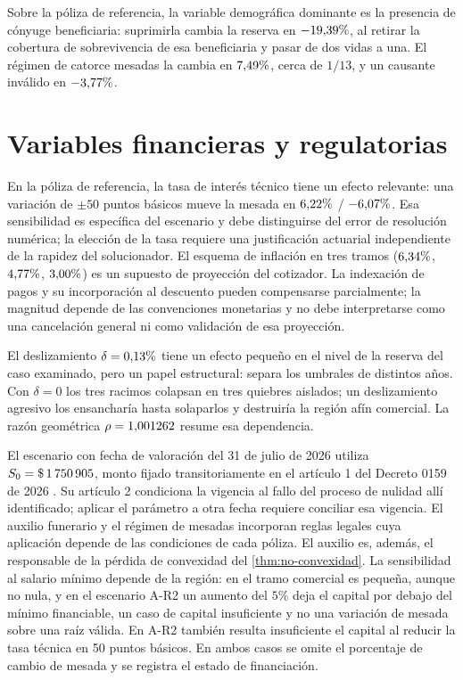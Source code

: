 Sobre la póliza de referencia, la variable demográfica dominante es la presencia de
cónyuge beneficiaria: suprimirla cambia la reserva en $-19{,}39\%$,
al retirar la cobertura de sobrevivencia de esa beneficiaria y pasar de dos vidas
a una. El régimen de catorce mesadas la cambia en $7{,}49\%$, cerca
de $1/13$, y un causante inválido en $-3{,}77\%$.

\section{Variables financieras y regulatorias}
\label{sec:sensibilidad}

En la póliza de referencia, la tasa de interés técnico tiene un efecto relevante:
una variación de $\pm50$ puntos básicos mueve la mesada en
$6{,}22\%$ / $-6{,}07\%$. Esa sensibilidad es específica del
escenario y debe distinguirse del error de resolución numérica; la
elección de la tasa requiere una justificación actuarial independiente de la
rapidez del solucionador. El esquema de inflación en tres tramos
($6{,}34\%$, $4{,}77\%$, $3{,}00\%$) es un supuesto de proyección
del cotizador. La indexación de pagos y su incorporación al descuento pueden
compensarse parcialmente; la magnitud depende de las convenciones monetarias y
no debe interpretarse como una cancelación general ni como validación de esa
proyección.

El deslizamiento $\delta=0{,}13\%$ tiene un efecto pequeño en el
nivel de la reserva del caso examinado, pero un papel estructural: separa los
umbrales de distintos años.
Con $\delta=0$ los tres racimos colapsan en tres quiebres aislados; un
deslizamiento agresivo los ensancharía hasta solaparlos y destruiría la región afín
comercial. La razón geométrica $\rho=1{,}001262$ resume esa dependencia.

El escenario con fecha de valoración del 31 de julio de 2026 utiliza
$S_0=\$\,1\,750\,905$, monto fijado transitoriamente en el artículo 1 del Decreto
0159 de 2026 \citep{presidencia2026smlv}. Su artículo 2 condiciona la vigencia al
fallo del proceso de nulidad allí identificado; aplicar el parámetro a otra fecha
requiere conciliar esa vigencia. El auxilio funerario y el régimen de mesadas
incorporan reglas legales cuya aplicación depende de las condiciones de cada
póliza. El auxilio es, además, el responsable de la pérdida de convexidad del
\cref{thm:no-convexidad}. La sensibilidad al salario mínimo depende de la región:
en el tramo comercial es pequeña, aunque no nula, y en el escenario A-R2 un
aumento del $5\%$ deja el capital por debajo del mínimo financiable, un caso de
capital insuficiente y no una variación de mesada sobre una raíz válida.
En A-R2 también resulta insuficiente el capital al reducir la tasa técnica
en 50 puntos básicos. En ambos casos se omite el porcentaje de cambio de
mesada y se registra el estado de financiación.

